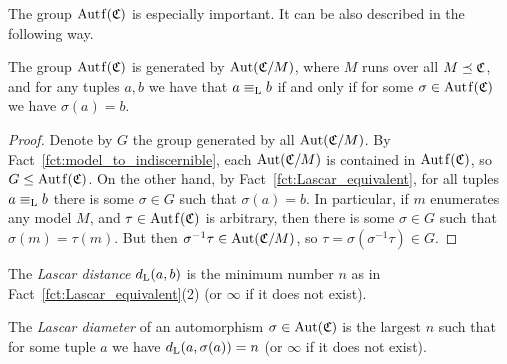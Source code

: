 	The group $\Autf(\fC)$ is especially important. It can be also described in the following way.
	\begin{fct}
		\label{fct:lst_witn_by_aut}
		The group $\Autf(\fC)$ is generated by $\operatorname{{Aut}}({\mathfrak C}/M)$, where $M$ runs over all $M\preceq {\mathfrak C}$, and for any tuples $a,b$ we have that $a\equiv_{\mathrm{L}} b$ if and only if for some $\sigma\in \Autf(\fC)$ we have $\sigma(a)=b$.
	\end{fct}
	\begin{proof}
		Denote by $G$ the group generated by all $\operatorname{{Aut}}({\mathfrak C}/M)$. By Fact~\ref{fct:model_to_indiscernible}, each $\operatorname{{Aut}}({\mathfrak C}/M)$ is contained in $\Autf(\fC)$, so $G\leq \Autf(\fC)$. On the other hand, by Fact~\ref{fct:Lascar_equivalent}, for all tuples $a\equiv_{\mathrm{L}} b$ there is some $\sigma\in G$ such that $\sigma(a)=b$. In particular, if $m$ enumerates any model $M$, and $\tau\in \Autf(\fC)$ is arbitrary, then there is some $\sigma\in G$ such that $\sigma(m)=\tau(m)$. But then $\sigma^{-1}\tau\in \operatorname{{Aut}}({\mathfrak C}/M)$, so $\tau=\sigma(\sigma^{-1}\tau)\in G$.
	\end{proof}
	
	
	
	\begin{dfn}
		\label{dfn:Lascar distance}
		The \emph{Lascar distance} $d_{\mathrm{L}}(a,b)$ is the minimum number $n$ as in Fact~\ref{fct:Lascar_equivalent}(2) (or $\infty$ if it does not exist).
		
		The \emph{Lascar diameter} of an automorphism $\sigma\in \operatorname{{Aut}}({\mathfrak C})$ is the largest $n$ such that for some tuple $a$ we have $d_{\mathrm{L}}(a,\sigma(a))=n$ (or $\infty$ if it does not exist).\xqed{\lozenge}
	\end{dfn}
	

